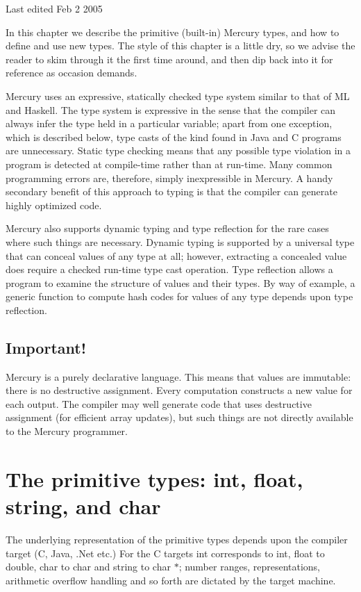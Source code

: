 \documentclass[a4paper,11pt,notitlepage,onecolumn]{book}
\begin{document}
Last edited Feb 2 2005

In this chapter we describe the primitive (\ie built-in) Mercury types, and
how to define and use new types.  The style of this chapter is a little dry,
so we advise the reader to skim through it the first time around, and then
dip back into it for reference as occasion demands.

Mercury uses an expressive, statically checked type system similar to
that of ML and Haskell.  The type system is expressive in the sense that the
compiler can always infer the type held in a particular variable; apart from
one exception, which is described below, type casts of the kind found in
Java and C programs are unnecessary.  Static type checking means that any
possible type violation in a program is detected at compile-time rather than
at run-time.  Many common programming errors are, therefore, simply
inexpressible in Mercury.  A handy secondary benefit of this approach to
typing is that the compiler can generate highly optimized code.

Mercury also supports dynamic typing and type reflection for the rare cases
where such things are necessary.  Dynamic typing is supported by a universal
type that can conceal values of any type at all; however, extracting a
concealed value does require a checked run-time type cast operation.  Type
reflection allows a program to examine the structure of values and their
types.  By way of example, a generic function to compute hash codes for
values of any type depends upon type reflection.

\subsection*{Important!}

Mercury is a purely declarative language.  This means that values are
immutable: there is no destructive assignment.  Every computation constructs
a new value for each output.  The compiler may well generate code that uses
destructive assignment (\eg for efficient array updates), but such things
are not directly available to the Mercury programmer.



\section{The primitive types: \textsf{int}, \textsf{float}, \textsf{string}, and \textsf{char}}

\Note The underlying representation of the primitive types
depends upon the compiler target (C, Java, .Net etc.)  For the C targets
\textsf{int} corresponds to \textsf{int}, \textsf{float} to \textsf{double}, \textsf{char} to \textsf{char}
and \textsf{string} to \textsf{char {\ensuremath{*}}}; number ranges, representations, arithmetic
overflow handling and so forth are dictated by the target machine.
\end{document}

